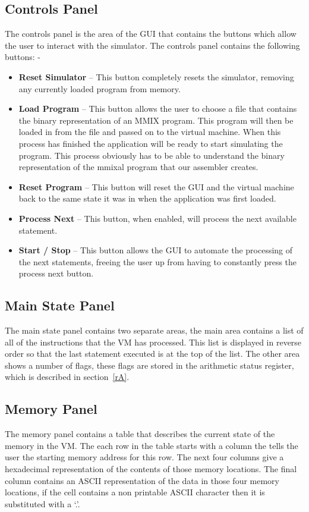 \documentclass[a4paper,11pt]{report}
\begin{document}
\subsection{Controls Panel}
The controls panel is the area of the GUI that contains the buttons which allow the user to interact with the simulator. The controls panel contains the following buttons: -
\begin{itemize}
\item \textbf{Reset Simulator} -- This button completely resets the simulator, removing any currently loaded program from memory.
\item \textbf{Load Program} -- This button allows the user to choose a file that contains the binary representation of an MMIX program. This program will then be loaded in from the file and passed on to the virtual machine. When this process has finished the application will be ready to start simulating the program. This process obviously has to be able to understand the binary representation of the mmixal program that our assembler creates.
\item \textbf{Reset Program} -- This button will reset the GUI and the virtual machine back to the same state it was in when the application was first loaded.
\item \textbf{Process Next} -- This button, when enabled, will process the next available statement.
\item \textbf{Start / Stop} -- This button allows the GUI to automate the processing of the next statements, freeing the user up from having to constantly press the process next button.
\end{itemize}
\subsection{Main State Panel}
The main state panel contains two separate areas, the main area contains a list of all of the instructions that the VM has processed. This list is displayed in reverse order so that the last statement executed is at the top of the list. The other area shows a number of flags, these flags are stored in the arithmetic status register, which is described in section~\ref{rA}.
\subsection{Memory Panel}
The memory panel contains a table that describes the current state of the memory in the VM. The each row in the table starts with a column the tells the user the starting memory address for this row. The next four columns give a hexadecimal representation of the contents of those memory locations. The final column contains an ASCII representation of the data in those four memory locations, if the cell contains a non printable ASCII character then it is substituted with a `.'. 
\end{document}
